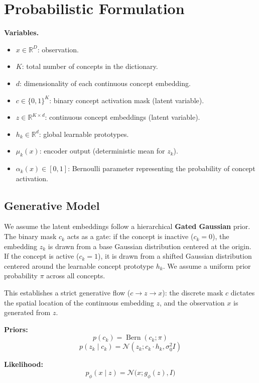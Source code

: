 \documentclass[11pt, a4paper]{article}
\title{}
\author{}
\date{}
\begin{document}
\section{Probabilistic Formulation}

\noindent \textbf{Variables.}
\begin{itemize}
    \item $x \in \mathbb{R}^D$: observation.
    \item $K$: total number of concepts in the dictionary.
    \item $d$: dimensionality of each continuous concept embedding.
    \item $c \in \{0,1\}^K$: binary concept activation mask (latent variable).
    \item $z \in \mathbb{R}^{K \times d}$: continuous concept embeddings (latent variable).
    \item $h_k \in \mathbb{R}^d$: global learnable prototypes.
    \item $\mu_k(x)$: encoder output (deterministic mean for $z_k$).
    \item $\alpha_k(x) \in [0,1]$: Bernoulli parameter representing the probability of concept activation.
\end{itemize}

\subsection{Generative Model}

We assume the latent embeddings follow a hierarchical \textbf{Gated Gaussian} prior. The binary mask $c_k$ acts as a gate: if the concept is inactive ($c_k=0$), the embedding $z_k$ is drawn from a base Gaussian distribution centered at the origin. If the concept is active ($c_k=1$), it is drawn from a shifted Gaussian distribution centered around the learnable concept prototype $h_k$. We assume a uniform prior probability $\pi$ across all concepts.

This establishes a strict generative flow ($c \to z \to x$): the discrete mask $c$ dictates the spatial location of the continuous embedding $z$, and the observation $x$ is generated from $z$. 

\textbf{Priors:}
\[
p(c_k) = \operatorname{Bern}(c_k; \pi)
\]
\[
p(z_k \mid c_k) = \mathcal{N}(z_k; c_k \cdot h_k, \sigma_0^2 I)
\]

\textbf{Likelihood:}
\[
p_\phi(x \mid z) = \mathcal{N}\!\bigl(x; g_\phi(z), I\bigr)
\]
\end{document}
